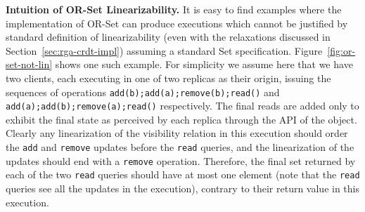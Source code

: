 \smallskip
\noindent
{\bf Intuition of OR-Set Linearizability.}
It is easy to find examples where the implementation of OR-Set can
produce executions which cannot be justified by standard definition of
linearizability (even with the relaxations discussed in Section~\ref{sec:rga-crdt-impl})
assuming a standard Set specification.
%
Figure~\ref{fig:or-set-not-lin} shows one such example.
%
For simplicity we assume here that we have two clients, each executing
in one of two replicas as their origin, issuing the sequences of
operations \lstinline|add(b);add(a);remove(b);read()| and
\lstinline|add(a);add(b);remove(a);read()| respectively.
%
The final reads are added only to exhibit the final state as perceived by
each replica through the API of the object.
%
Clearly any linearization of the visibility relation in this execution should order
the \lstinline|add| and \lstinline|remove| updates before the \lstinline|read| queries,
and the linearization of the updates should end with a
\lstinline|remove| operation. 
Therefore, the final set returned by each of the two \lstinline|read| queries should have
at most one element (note that the \lstinline|read| queries see all the updates
in the execution), contrary to their return value in this execution.
%


